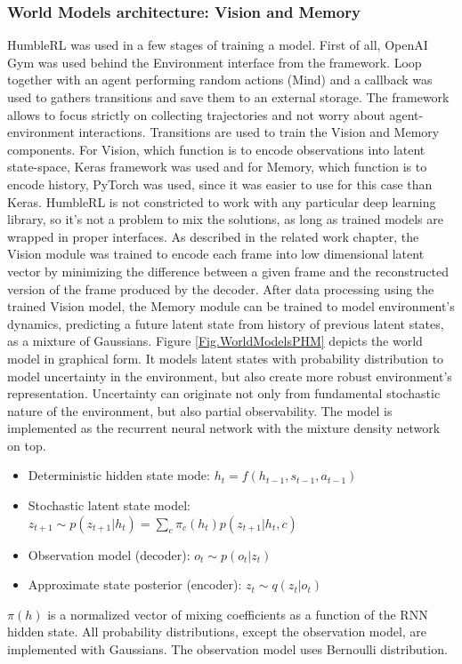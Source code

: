 \subsubsection{World Models architecture: Vision and Memory}
HumbleRL was used in a few stages of training a model. First of all, OpenAI Gym was used behind the Environment interface from the framework. Loop together with an agent performing random actions (Mind) and a callback was used to gathers transitions and save them to an external storage. The framework allows to focus strictly on collecting trajectories and not worry about agent-environment interactions.
Transitions are used to train the Vision and Memory components. For Vision, which function is to encode observations into latent state-space, Keras \cite{Code.Keras} framework was used and for Memory, which function is to encode history, PyTorch \cite{Code.PyTorch} was used, since it was easier to use for this case than Keras. HumbleRL is not constricted to work with any particular deep learning library, so it’s not a problem to mix the solutions, as long as trained models are wrapped in proper interfaces.
As described in the related work chapter, the Vision module was trained to encode each frame into low dimensional latent vector by minimizing the difference between a given frame and the reconstructed version of the frame produced by the decoder. After data processing using the trained Vision model, the Memory module can be trained to model environment's dynamics, predicting a future latent state from history of previous latent states, as a mixture of Gaussians.
Figure \ref{Fig.WorldModelsPHM} depicts the world model in graphical form. It models latent states with probability distribution to model uncertainty in the environment, but also create more robust environment's representation. Uncertainty can originate not only from fundamental stochastic nature of the environment, but also partial observability. The model is implemented as the recurrent neural network with the mixture density network on top.
\begin{itemize}
\item Deterministic hidden state mode:       $h_t = f(h_{t-1}, s_{t-1}, a_{t-1})$
\item Stochastic latent state model:         $z_{t+1} \sim p(z_{t+1}|h_t) = \sum_c\pi_c(h_t)p(z_{t+1}|h_t, c)$
\item Observation model (decoder):           $o_t \sim p(o_t|z_t)$
\item Approximate state posterior (encoder): $z_t \sim q(z_t|o_t)$
\end{itemize}
$\pi(h)$ is a normalized vector of mixing coefficients as a function of the RNN hidden state. All probability distributions, except the observation model, are implemented with Gaussians. The observation model uses Bernoulli distribution.

